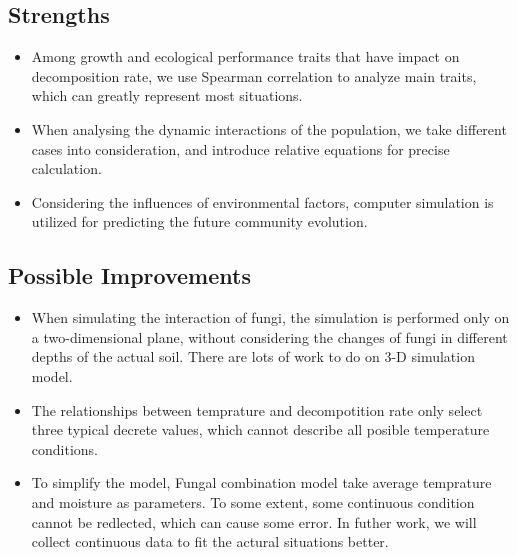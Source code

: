 \documentclass{mcmthesis}
\begin{document}
\subsection{Strengths}

\begin{itemize}
  \item Among growth and ecological performance traits that have impact on decomposition rate, we use Spearman correlation to analyze main traits, which can greatly represent most situations.
  \item When analysing the dynamic interactions of the population, we take different cases into consideration, and introduce relative equations for precise calculation.
  \item Considering the influences of environmental factors, computer simulation is utilized for predicting the future community evolution.
\end{itemize}

\subsection{Possible Improvements}

\begin{itemize}
  \item When simulating the interaction of fungi, the simulation is performed only on a two-dimensional plane, without considering the changes of fungi in different depths of the actual soil. There are lots of work to do on 3-D simulation model.
  \item The relationships between temprature and decompotition rate only select three typical decrete values, which cannot describe all posible temperature conditions.
  \item To simplify the model, Fungal combination model take average temprature and moisture as parameters. To some extent, some continuous condition cannot be redlected, which can cause some error. In futher work, we will collect continuous data to fit the actural situations better.
\end{itemize}








{}


\newpage
\end{document}
